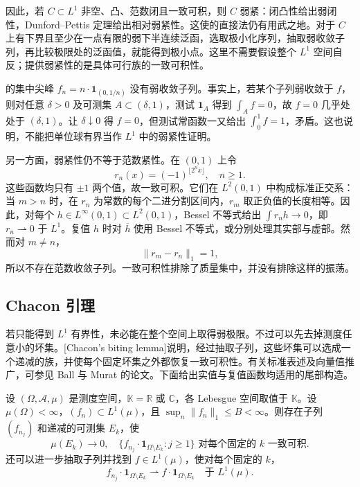 因此，若 \(C\subset L^1\) 非空、凸、范数闭且一致可积，则 \(C\) 弱紧：闭凸性给出弱闭性，Dunford--Pettis 定理给出相对弱紧性。这使的直接法仍有用武之地。对于 \(C\) 上有下界且至少在一点有限的弱下半连续泛函，选取极小化序列，抽取弱收敛子列，再比较极限处的泛函值，就能得到极小点。这里不需要假设整个 \(L^1\) 空间自反；提供弱紧性的是具体可行族的一致可积性。

\ProseParagraphBreak

的集中尖峰 \(f_n=n\cdot\mathbf1_{(0,1/n)}\) 没有弱收敛子列。事实上，若某个子列弱收敛于 \(f\)，则对任意 \(\delta>0\) 及可测集 \(A\subset(\delta,1)\)，测试 \(\mathbf1_A\) 得到 \(\int_Af=0\)，故 \(f=0\) 几乎处处于 \((\delta,1)\)。让 \(\delta\downarrow0\) 得 \(f=0\)，但测试常函数一又给出 \(\int_0^1f=1\)，矛盾。这也说明，不能把单位球有界当作 \(L^1\) 中的弱紧性证明。

\ProseParagraphBreak

另一方面，弱紧性仍不等于范数紧性。在 \((0,1)\) 上令
\[
  r_n(x)=(-1)^{\lfloor2^nx\rfloor},\quad n\geq1.
\]
这些函数均只有 \(\pm1\) 两个值，故一致可积。它们在 \(L^2(0,1)\) 中构成标准正交系：当 \(m>n\) 时，在 \(r_n\) 为常数的每个二进分割区间内，\(r_m\) 取正负值的长度相等。因此，对每个 \(h\in L^\infty(0,1)\subset L^2(0,1)\)，Bessel 不等式给出 \(\int r_nh\to0\)，即 \(r_n\rightharpoonup0\) 于 \(L^1\)。复值 \(h\) 时对 \(\overline h\) 使用 Bessel 不等式，或分别处理其实部与虚部。然而对 \(m\ne n\)，
\[
  \|r_m-r_n\|_1=1,
\]
所以不存在范数收敛子列。一致可积性排除了质量集中，并没有排除这样的振荡。

\subsection{Chacon 引理}
\label{b1:subsec:100504}

若只能得到 \(L^1\) 有界性，未必能在整个空间上取得弱极限。不过可以先去掉测度任意小的坏集。[Chacon's biting lemma]说明，经过抽取子列，这些坏集可以选成一个递减的族，并使每个固定坏集之外都恢复一致可积性。有关标准表述及向量值推广，可参见 Ball 与 Murat 的论文\cite{BallMurat1989Biting}。下面给出实值与复值函数均适用的尾部构造。

\begin{theorem}
\label{b1:thm:chacon-biting}
设 \((\Omega,\mathcal A,\mu)\) 是测度空间，\(\mathbb K=\mathbb R\) 或 \(\mathbb C\)，各 Lebesgue 空间取值于 \(\mathbb K\)。设 \(\mu(\Omega)<\infty\)，\((f_n)\subset L^1(\mu)\)，且 \(\sup_n\|f_n\|_1\leq B<\infty\)。则存在子列 \((f_{n_j})\) 和递减的可测集 \(E_k\)，使
\[
  \mu(E_k)\longrightarrow0,
  \quad
  \{f_{n_j}\cdot\mathbf1_{\Omega\setminus E_k}:j\geq1\}
  \text{ 对每个固定的 }k\text{ 一致可积}.
\]
还可以进一步抽取子列并找到 \(f\in L^1(\mu)\)，使对每个固定的 \(k\)，
\[
  f_{n_j}\cdot\mathbf1_{\Omega\setminus E_k}
  \rightharpoonup f\cdot\mathbf1_{\Omega\setminus E_k}
  \quad\text{于 }L^1(\mu).
\]
\end{theorem}

